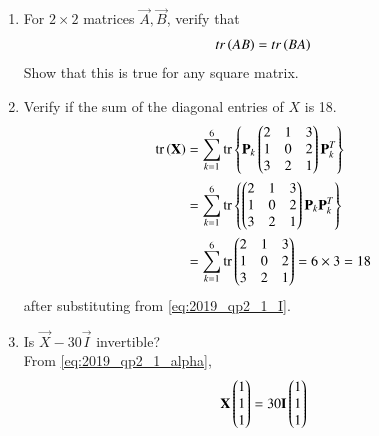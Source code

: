 \documentclass[journal,12pt,twocolumn]{IEEEtran}
\renewcommand\thesection{\arabic{section}}
\begin{document}
\begin{enumerate}[label=\thesection.\arabic*
,ref=\thesection.\theenumi]
\begin{align}
\label{eq:2019_qp2_1_I}
\vec{P}_k\vec{P}_k^T = \vec{I}
\end{align}
\solution
\begin{align}
\vec{P}_k = \myvec{\vec{v}_{k1}^T\\\vec{v}_{k2}^T\\\vec{v}_{k3}^T}
\end{align}
%
where $\vec{v}_{ki}, i = 1,2,3$ are from the standard basis.  Then,
\begin{align}
\vec{P}_k\vec{P}_k^T &= \myvec{\vec{v}_{k1}^T\\\vec{v}_{k2}^T\\\vec{v}_{k3}^T}\myvec{\vec{v}_{k1}&\vec{v}_{k2}&\vec{v}_{k3}}
 \vec{I}
\nonumber
\\
\because 
\vec{v}_{ji}^T\vec{v}_{kj} &= \delta_{jk}
\end{align}
%
\item For $2\times 2$ matrices $\vec{A},\vec{B}$, verify that 
\begin{align}
tr\left(AB\right)=tr\left(BA\right)
\end{align}
%
Show that this is true for any square matrix.
\item Verify if the sum of the diagonal entries of $X$ is 18.
\\
\solution 
\begin{align}
\text{tr}\left(\mathbf{X}\right) &= \sum_{k=1}^{6}\text{tr}\left\{\mathbf{P}_k\begin{pmatrix}2 & 1 & 3 \\ 1 & 0 & 2 \\ 3 & 2 & 1\end{pmatrix}\mathbf{P}_k^T\right\}
\nonumber \\
&= \sum_{k=1}^{6}\text{tr}\left\{\begin{pmatrix}2 & 1 & 3 \\ 1 & 0 & 2 \\ 3 & 2 & 1\end{pmatrix}\mathbf{P}_k\mathbf{P}_k^T\right\}
\nonumber \\
&= \sum_{k=1}^{6}\text{tr}\begin{pmatrix}2 & 1 & 3 \\ 1 & 0 & 2 \\ 3 & 2 & 1\end{pmatrix} = 6\times 3 = 18
\end{align}
after substituting from \eqref{eq:2019_qp2_1_I}.
%
\item Is $\vec{X}-30\vec{I}$ invertible?
\\
\solution From \eqref{eq:2019_qp2_1_alpha},
\begin{align}
\vec{X}\myvec{1 \\1 \\1} &=30\vec{I}\myvec{1 \\1 \\1} 
\nonumber \\

\end{align}
\end{enumerate}
\end{document}

